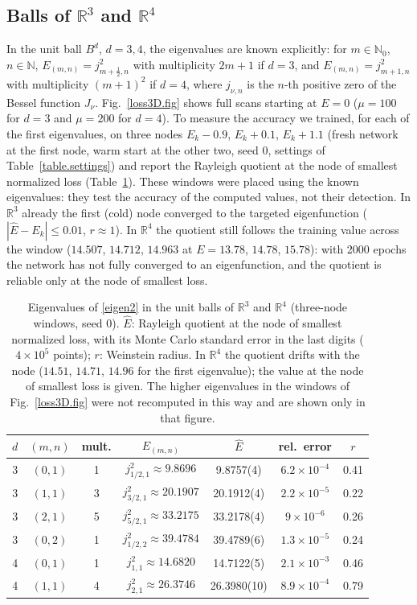 \documentclass[10pt]{amsart}
\theoremstyle{definition}
\theoremstyle{remark}
\theoremstyle{plain}
\newcommand{\R}{\mathbb{R}}
\newcommand{\N}{\mathbb{N}}
\begin{document}
\subsection{Balls of \texorpdfstring{$\R^3$}{R3} and \texorpdfstring{$\R^4$}{R4}}
In the unit ball $B^d$, $d=3,4$, the eigenvalues are known explicitly: for $m\in\N_0$, $n\in\N$,
$E_{(m,n)}=j_{m+\frac12,n}^2$ with multiplicity $2m+1$ if $d=3$, and $E_{(m,n)}=j_{m+1,n}^2$ with
multiplicity $(m+1)^2$ if $d=4$, where $j_{\nu,n}$ is the $n$-th positive zero of the Bessel function
$J_\nu$. Fig.~\ref{loss3D.fig} shows full scans starting at $E=0$ ($\mu=100$ for $d=3$ and $\mu=200$ for
$d=4$). To measure the accuracy we trained, for each of the first eigenvalues, on three nodes $E_k-0.9$,
$E_k+0.1$, $E_k+1.1$ (fresh network at the first node, warm start at the other two, seed 0, settings of
Table~\ref{table.settings}) and report the Rayleigh quotient at the node of smallest normalized loss
(Table~\ref{table.2}). These windows were placed using the known eigenvalues: they test the accuracy of
the computed values, not their detection. In $\R^3$ already the first (cold) node converged to the
targeted eigenfunction ($|\hat E-E_k|\le0.01$, $r\approx1$). In $\R^4$ the quotient still follows the
training value across the window ($14.507$, $14.712$, $14.963$ at $E=13.78$, $14.78$, $15.78$): with 2000
epochs the network has not fully converged to an eigenfunction, and the quotient is reliable only at
the node of smallest loss.

\begin{table}[tbp]
\centering\small
\caption{Eigenvalues of \eqref{eigen2} in the unit balls of $\R^3$ and $\R^4$ (three-node windows, seed 0). $\hat E$: Rayleigh quotient at the node of smallest normalized loss, with its Monte Carlo standard error in the last digits ($4\times10^5$ points); $r$: Weinstein radius. In $\R^4$ the quotient drifts with the node ($14.51$, $14.71$, $14.96$ for the first eigenvalue); the value at the node of smallest loss is given. The higher eigenvalues in the windows of Fig.~\ref{loss3D.fig} were not recomputed in this way and are shown only in that figure.}
\label{table.2}
\begin{tabular}{ccccccc}
\toprule
$d$ & $(m,n)$ & mult. & $E_{(m,n)}$ & $\hat E$ & rel.\ error & $r$\\
\midrule
3 & $(0,1)$ & 1 & $j_{1/2,1}^2\approx9.8696$ & 9.8757(4) & $6.2\times10^{-4}$ & 0.41\\
3 & $(1,1)$ & 3 & $j_{3/2,1}^2\approx20.1907$ & 20.1912(4) & $2.2\times10^{-5}$ & 0.22\\
3 & $(2,1)$ & 5 & $j_{5/2,1}^2\approx33.2175$ & 33.2178(4) & $9\times10^{-6}$ & 0.26\\
3 & $(0,2)$ & 1 & $j_{1/2,2}^2\approx39.4784$ & 39.4789(6) & $1.3\times10^{-5}$ & 0.24\\
\midrule
4 & $(0,1)$ & 1 & $j_{1,1}^2\approx14.6820$ & 14.7122(5) & $2.1\times10^{-3}$ & 0.46\\
4 & $(1,1)$ & 4 & $j_{2,1}^2\approx26.3746$ & 26.3980(10) & $8.9\times10^{-4}$ & 0.79\\
\bottomrule
\end{tabular}
\end{table}
\end{document}

